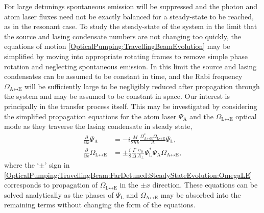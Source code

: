 For large detunings spontaneous emission will be suppressed and the photon and atom laser fluxes need not be exactly balanced for a steady-state to be reached, as in the resonant case.  To study the steady-state of the system in the limit that the source and lasing condensate numbers are not changing too quickly, the equations of motion \eqref{OpticalPumping:TravellingBeamEvolution} may be simplified by moving into appropriate rotating frames to remove simple phase rotation and neglecting spontaneous emission.  In this limit the source and lasing condensates can be assumed to be constant in time, and the Rabi frequency $\Omega_{\text{A} \leftrightarrow \text{E}}$ will be sufficiently large to be negligibly reduced after propagation through the system and may be assumed to be constant in space.  Our interest is principally in the transfer process itself.  This may be investigated by considering the simplified propagation equations for the atom laser $\Psi_\text{A}$ and the $\Omega_{\text{L} \leftrightarrow \text{E}}$ optical mode as they traverse the lasing condensate in steady state,
\begin{subequations}
    \label{OpticalPumping:TravellingBeam:FarDetuned:SteadyStateEvolution}
    \begin{align}
        \frac{\partial}{\partial x} \Psi_\text{A} &= -i \frac{M}{2 \hbar k} \frac{\Omega_{\text{A}\leftrightarrow\text{E}}^* \Omega_{\text{L} \leftrightarrow \text{E}}^{\phantom{*}}}{\Delta} \Psi_\text{L}, \label{OpticalPumping:TravellingBeam:FarDetuned:SteadyStateEvolution:PsiA}\\
        \frac{\partial}{\partial x} \Omega_{\text{L} \leftrightarrow \text{E}} &= \pm \frac{i}{8} \frac{\Gamma}{\Delta} \frac{\sigma_0}{A_\perp} \Psi_\text{L}^* \Psi_\text{A}^{\phantom{*}} \Omega_{\text{A} \leftrightarrow \text{E}}, \label{OpticalPumping:TravellingBeam:FarDetuned:SteadyStateEvolution:OmegaLE}
    \end{align}
\end{subequations}
where the `$\pm$' sign in \eqref{OpticalPumping:TravellingBeam:FarDetuned:SteadyStateEvolution:OmegaLE} corresponds to propagation of $\Omega_{\text{L} \leftrightarrow \text{E}}$ in the $\pm x$ direction.  These equations can be solved analytically as the phases of $\Psi_\text{L}$ and $\Omega_{\text{A} \leftrightarrow \text{E}}$ may be absorbed into the remaining terms without changing the form of the equations.

